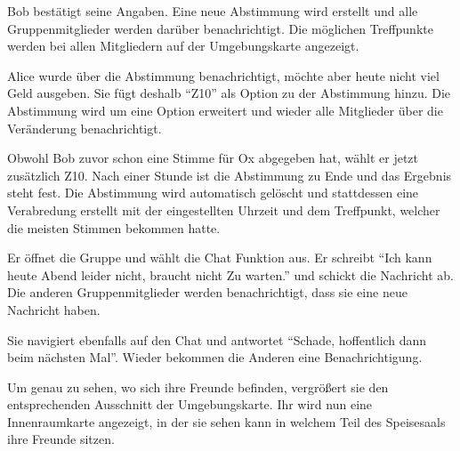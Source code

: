 \documentclass[parskip=full,11pt]{scrartcl}
\begin{document}
{Bob bestätigt seine Angaben.}
{Eine neue Abstimmung wird erstellt und alle Gruppenmitglieder werden darüber benachrichtigt.
Die möglichen Treffpunkte werden bei allen Mitgliedern auf der Umgebungskarte angezeigt.}

{Alice wurde über die Abstimmung benachrichtigt, möchte aber heute nicht viel Geld ausgeben.
Sie fügt deshalb \enquote{Z10} als Option zu der Abstimmung hinzu.}
{Die Abstimmung wird um eine Option erweitert und
wieder alle Mitglieder über die Veränderung benachrichtigt.}

{Obwohl Bob zuvor schon eine Stimme für Ox abgegeben hat, wählt er jetzt zusätzlich Z10.}
{Nach einer Stunde ist die Abstimmung zu Ende und das Ergebnis steht fest.
Die Abstimmung wird automatisch gelöscht und stattdessen eine Verabredung erstellt mit der
eingestellten Uhrzeit und dem Treffpunkt, welcher die meisten Stimmen bekommen hatte.}


{Er öffnet die Gruppe und wählt die Chat Funktion aus. Er schreibt \enquote{Ich kann heute Abend leider nicht, braucht nicht Zu warten.} und schickt die Nachricht ab.}
{Die anderen Gruppenmitglieder werden benachrichtigt, dass sie eine neue Nachricht haben.}

{Sie navigiert ebenfalls auf den Chat und antwortet \enquote{Schade, hoffentlich dann beim
nächsten Mal}.}
{Wieder bekommen die Anderen eine Benachrichtigung.}

{Um genau zu sehen, wo sich ihre Freunde befinden, vergrößert sie den entsprechenden
Ausschnitt der Umgebungskarte.}
{Ihr wird nun eine Innenraumkarte angezeigt, in der sie sehen kann in welchem Teil
des Speisesaals ihre Freunde sitzen.}
\end{document}
